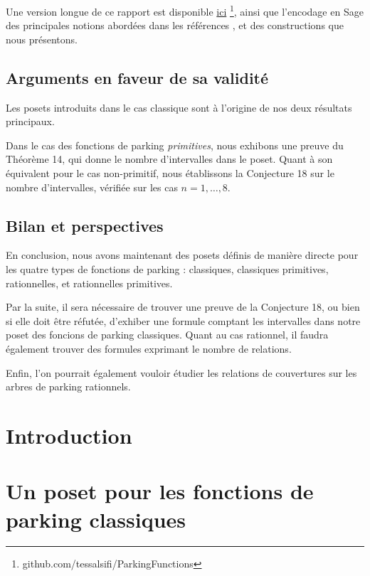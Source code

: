 \documentclass[11pt]{article}
\theoremstyle{remark}
\theoremstyle{definition}
\begin{document}
Une version longue de ce rapport est disponible 
\href{https://github.com/tessalsifi/ParkingFunctions}{ici}
\footnote{github.com/tessalsifi/ParkingFunctions}, ainsi que l'encodage
en Sage des principales notions abordées dans les références \cite{ref1,
ref2, ref3, ref4, ref5, ref6, ref7, ref8, ref9}, et des
constructions que nous présentons.

\subsection*{Arguments en faveur de sa validité}
Les posets introduits dans le cas classique sont à l'origine de nos
deux résultats principaux.

Dans le cas des fonctions de parking \emph{primitives}, nous exhibons
une preuve du Théorème 14, qui donne le nombre d'intervalles dans le
poset.
Quant à son équivalent pour le cas non-primitif, nous établissons la
Conjecture 18 sur le nombre d'intervalles, vérifiée sur les cas
$n = 1, \ldots, 8$.

\subsection*{Bilan et perspectives}
En conclusion, nous avons maintenant des posets définis de manière
directe pour les quatre types de fonctions de parking : classiques, 
classiques primitives, rationnelles, et rationnelles primitives.

Par la suite, il sera nécessaire de trouver une preuve de la Conjecture 18,
ou bien si elle doit être réfutée, d'exhiber une formule comptant les
intervalles dans notre poset des foncions de parking classiques.
Quant au cas rationnel, il faudra également trouver des formules exprimant
le nombre de relations.

Enfin, l'on pourrait également vouloir étudier les relations de couvertures
sur les arbres de parking rationnels. 

\newpage

\tableofcontents

\section{Introduction}


\section{Un poset pour les fonctions de parking classiques}

\end{document}
